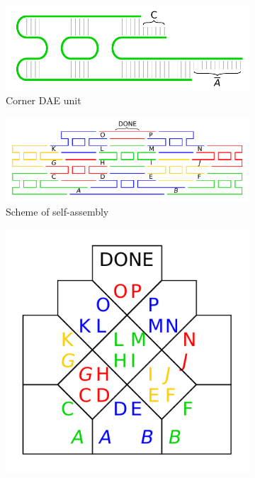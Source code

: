 

\begin{figure}[H]
\begin{center}
	\begin{subfigure}[b]{0.31\textwidth}
		\includegraphics[width=\textwidth]{./figures/tile_model/DNA_struct.pdf} %
		\caption{Corner DAE unit}
		\label{fig:DNA_struct}
	\end{subfigure}
	\begin{subfigure}[b]{0.472\textwidth}
		\includegraphics[width=\textwidth]{./figures/tile_model/DNA_assembly.pdf} %
		\caption{Scheme of self-assembly}
		\label{fig:DNA_assembly}
	\end{subfigure}
	\begin{subfigure}[b]{0.190\textwidth}
		\includegraphics[width=\textwidth]{./figures/tile_model/abstract_model.pdf} %

\end{subfigure}
\end{center}
\end{figure}
